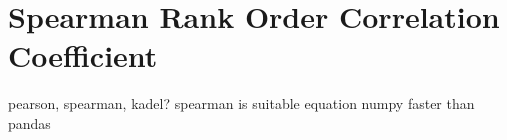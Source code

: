\section{Spearman Rank Order Correlation Coefficient}
pearson, spearman, kadel?
spearman is suitable
equation
numpy faster than pandas



